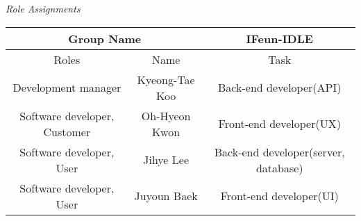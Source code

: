 \documentclass{scrartcl}
\begin{document}
    \begin{center}
    \caption{\textit{Role Assignments}}
    \begin{tabular}{|c|c|c|}
    \hline
    \multicolumn{2}{|c|}{Group Name} & IFeun-IDLE \\
    \hline
      Roles & Name & Task\\
    \hline
      Development manager & Kyeong-Tae Koo & Back-end developer(API) \\
    \hline
      Software developer, Customer & Oh-Hyeon Kwon & Front-end developer(UX)\\
    \hline
      Software developer, User & Jihye Lee & Back-end developer(server, database)\\
    \hline
      Software developer, User & Juyoun Baek & Front-end developer(UI)\\
    \hline
    \end{tabular}
    \end{center}
\end{document}
